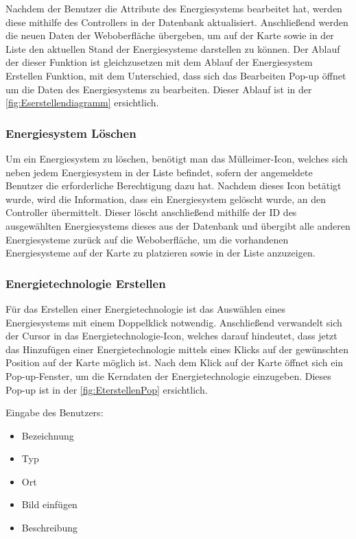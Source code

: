 Nachdem der Benutzer die Attribute des Energiesystems bearbeitet hat, werden diese mithilfe des Controllers in der Datenbank aktualisiert. Anschließend werden die neuen Daten der Weboberfläche übergeben, um auf der Karte sowie in der Liste den aktuellen Stand der Energiesysteme darstellen zu können. Der Ablauf der dieser Funktion ist gleichzusetzen mit dem Ablauf der Energiesystem Erstellen Funktion, mit dem Unterschied, dass sich das Bearbeiten Pop-up öffnet um die Daten des Energiesystems zu bearbeiten. Dieser Ablauf ist in der \autoref{fig:Eserstellendiagramm} ersichtlich.


\newpage
\subsubsection{Energiesystem Löschen}
Um ein Energiesystem zu löschen, benötigt man das Mülleimer-Icon, welches sich neben jedem Energiesystem in der Liste befindet, sofern der angemeldete Benutzer die erforderliche Berechtigung dazu hat. 
Nachdem dieses Icon betätigt wurde, wird die Information, dass ein Energiesystem gelöscht wurde, an den Controller übermittelt. Dieser löscht anschließend mithilfe der ID des ausgewählten Energiesystems dieses aus der Datenbank und übergibt alle anderen Energiesysteme zurück auf die Weboberfläche, um die vorhandenen Energiesysteme auf der Karte zu platzieren sowie in der Liste anzuzeigen. 
 
 
\subsubsection{Energietechnologie Erstellen}
Für das Erstellen einer Energietechnologie ist das Auswählen eines Energiesystems mit einem Doppelklick notwendig. Anschließend verwandelt sich der Cursor in das Energietechnologie-Icon, welches darauf hindeutet, dass jetzt das Hinzufügen einer Energietechnologie mittels eines Klicks auf der gewünschten Position auf der Karte möglich ist. Nach dem Klick auf der Karte öffnet sich ein Pop-up-Fenster, um die Kerndaten der Energietechnologie einzugeben. Dieses Pop-up ist in der \autoref{fig:EterstellenPop} ersichtlich. 


Eingabe des Benutzers:
\begin{itemize}
	\item Bezeichnung 
	\item Typ
	\item Ort
	\item Bild einfügen
	\item Beschreibung
\end{itemize}

